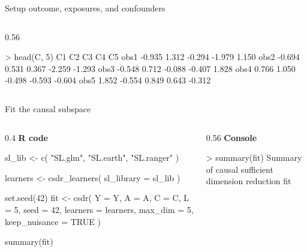 \documentclass[
  ignorenonframetext,
  aspectratio=169,
  11pt]{beamer}
\newenvironment{Shaded}{\begin{snugshade}}{\end{snugshade}}
\newcommand{\AttributeTok}[1]{\textcolor[rgb]{0.40,0.45,0.13}{#1}}
\newcommand{\ConstantTok}[1]{\textcolor[rgb]{0.56,0.35,0.01}{#1}}
\newcommand{\DecValTok}[1]{\textcolor[rgb]{0.68,0.00,0.00}{#1}}
\newcommand{\FunctionTok}[1]{\textcolor[rgb]{0.28,0.35,0.67}{#1}}
\newcommand{\NormalTok}[1]{\textcolor[rgb]{0.00,0.23,0.31}{#1}}
\newcommand{\OtherTok}[1]{\textcolor[rgb]{0.00,0.23,0.31}{#1}}
\newcommand{\StringTok}[1]{\textcolor[rgb]{0.13,0.47,0.30}{#1}}
\newcommand{\workflowcodefont}{\fontsize{6.3}{7.1}\selectfont}
\newcommand{\method}[1]{%
  \textcolor{emoryblue}{\textbf{#1}}%
}
\begin{document}
\begin{frame}[fragile,t]{Setup outcome, exposures, and confounders}
\begin{columns}[T]
\begin{column}{0.56\linewidth}
\begin{Shaded}
\begin{Highlighting}[]
\NormalTok{\textgreater{} head(C, 5)}
\NormalTok{         C1    C2     C3     C4     C5}
\NormalTok{obs1 {-}0.935 1.312 {-}0.294 {-}1.979  1.150}
\NormalTok{obs2 {-}0.694 0.531  0.367 {-}2.259 {-}1.293}
\NormalTok{obs3 {-}0.548 0.712 {-}0.088 {-}0.407  1.828}
\NormalTok{obs4  0.766 1.050 {-}0.498 {-}0.593 {-}0.604}
\NormalTok{obs5  1.852 {-}0.554  0.849  0.643 {-}0.312}
\end{Highlighting}
\end{Shaded}
\end{column}
\end{columns}
\end{frame}

\begin{frame}[fragile,t]{Fit the causal subspace}
\label{fit-the-causal-subspace}
\begin{columns}[T]
\begin{column}{0.4\linewidth}
\method{R code}

\workflowcodefont

\begin{Shaded}
\begin{Highlighting}[]
\NormalTok{sl\_lib }\OtherTok{\textless{}{-}} \FunctionTok{c}\NormalTok{(}
  \StringTok{"SL.glm"}\NormalTok{, }\StringTok{"SL.earth"}\NormalTok{, }\StringTok{"SL.ranger"}
\NormalTok{)}

\NormalTok{learners }\OtherTok{\textless{}{-}} \FunctionTok{csdr\_learners}\NormalTok{(}
  \AttributeTok{sl\_library =}\NormalTok{ sl\_lib}
\NormalTok{)}

\FunctionTok{set.seed}\NormalTok{(}\DecValTok{42}\NormalTok{)}
\NormalTok{fit }\OtherTok{\textless{}{-}} \FunctionTok{csdr}\NormalTok{(}
  \AttributeTok{Y =}\NormalTok{ Y, }\AttributeTok{A =}\NormalTok{ A, }\AttributeTok{C =}\NormalTok{ C,}
  \AttributeTok{L =} \DecValTok{5}\NormalTok{, }\AttributeTok{seed =} \DecValTok{42}\NormalTok{,}
  \AttributeTok{learners =}\NormalTok{ learners,}
  \AttributeTok{max\_dim =} \DecValTok{5}\NormalTok{,}
  \AttributeTok{keep\_nuisance =} \ConstantTok{TRUE}
\NormalTok{)}

\FunctionTok{summary}\NormalTok{(fit)}
\end{Highlighting}
\end{Shaded}
\end{column}

\begin{column}{0.56\linewidth}
\method{Console}

\workflowcodefont

\begin{Shaded}
\begin{Highlighting}[]
\NormalTok{\textgreater{} summary(fit)}
\NormalTok{Summary of causal sufficient dimension reduction fit}


\end{Highlighting}
\end{Shaded}
\end{column}
\end{columns}
\end{frame}
\end{document}
